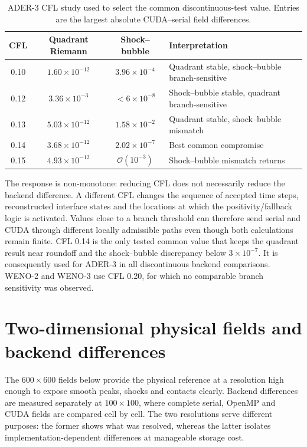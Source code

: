\begin{table}[H]
\centering
\small
\renewcommand{\arraystretch}{1.18}
\begin{tabular}{@{}ccc>{\raggedright\arraybackslash}p{}@{}}
\toprule
CFL & Quadrant Riemann & Shock--bubble & Interpretation \\
\midrule
0.10 & $1.60\times10^{-12}$ & $3.96\times10^{-4}$ & Quadrant stable, shock--bubble branch-sensitive \\
0.12 & $3.36\times10^{-3}$ & $<6\times10^{-8}$ & Shock--bubble stable, quadrant branch-sensitive \\
0.13 & $5.03\times10^{-12}$ & $1.58\times10^{-2}$ & Quadrant stable, shock--bubble mismatch \\
0.14 & $3.68\times10^{-12}$ & $2.02\times10^{-7}$ & Best common compromise \\
0.15 & $4.93\times10^{-12}$ & $\mathcal{O}(10^{-3})$ & Shock--bubble mismatch returns \\
\bottomrule
\end{tabular}
\caption{ADER-3 CFL study used to select the common discontinuous-test value. Entries are the largest absolute CUDA--serial field differences.}
\label{tab:ader3-cfl-study}
\end{table}

The response is non-monotone: reducing CFL does not necessarily reduce the backend difference. A different CFL changes the sequence of accepted time steps, reconstructed interface states and the locations at which the positivity/fallback logic is activated. Values close to a branch threshold can therefore send serial and CUDA through different locally admissible paths even though both calculations remain finite. CFL 0.14 is the only tested common value that keeps the quadrant result near roundoff and the shock--bubble discrepancy below $3\times10^{-7}$. It is consequently used for ADER-3 in all discontinuous backend comparisons. WENO-2 and WENO-3 use CFL 0.20, for which no comparable branch sensitivity was observed.

\FloatBarrier
\section{Two-dimensional physical fields and backend differences}
\label{sec:resolved-fields}

The \(600\times600\) fields below provide the physical reference at a resolution high
enough to expose smooth peaks, shocks and contacts clearly. Backend differences are
measured separately at \(100\times100\), where complete serial, OpenMP and CUDA fields
are compared cell by cell. The two resolutions serve different purposes: the former shows
what was resolved, whereas the latter isolates implementation-dependent differences at
manageable storage cost.

